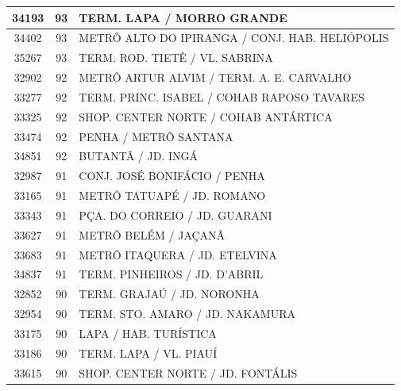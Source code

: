 \documentclass[
	12pt,				%
	oneside,			%
	a4paper,			%
	english,			%
	brazil				%
	]{abntex2ppgsi}
\begin{document}
{{\begin{apendicesenv}
\begin{longtable}{c|c|p{7cm}}
    34193 & 93    & TERM. LAPA / MORRO GRANDE \\
\hline

    34402 & 93    & METRÔ ALTO DO IPIRANGA / CONJ. HAB. HELIÓPOLIS \\
\hline

    35267 & 93    & TERM. ROD. TIETÊ  / VL. SABRINA \\
\hline

    32902 & 92    & METRÔ ARTUR ALVIM / TERM. A. E. CARVALHO \\
\hline

    33277 & 92    & TERM. PRINC. ISABEL / COHAB RAPOSO TAVARES \\
\hline

    33325 & 92    & SHOP. CENTER NORTE / COHAB ANTÁRTICA \\
\hline

    33474 & 92    & PENHA   / METRÔ SANTANA \\
\hline

    34851 & 92    & BUTANTÃ / JD. INGÁ \\
\hline

    32987 & 91    & CONJ. JOSÉ BONIFÁCIO / PENHA \\
\hline

    33165 & 91    & METRÔ TATUAPÉ / JD. ROMANO \\
\hline

    33343 & 91    & PÇA. DO CORREIO / JD. GUARANI \\
\hline

    33627 & 91    & METRÔ BELÉM / JAÇANÃ \\
\hline

    33683 & 91    & METRÔ ITAQUERA / JD. ETELVINA \\
\hline

    34837 & 91    & TERM. PINHEIROS / JD. D'ABRIL \\
\hline

    32852 & 90    & TERM. GRAJAÚ / JD. NORONHA \\
\hline

    32954 & 90    & TERM. STO. AMARO / JD. NAKAMURA \\
\hline

    33175 & 90    & LAPA / HAB. TURÍSTICA \\
\hline

    33186 & 90    & TERM. LAPA / VL. PIAUÍ \\
\hline

    33615 & 90    & SHOP. CENTER NORTE / JD. FONTÁLIS \\
\hline


\end{longtable}
\end{apendicesenv}}}
\end{document}
